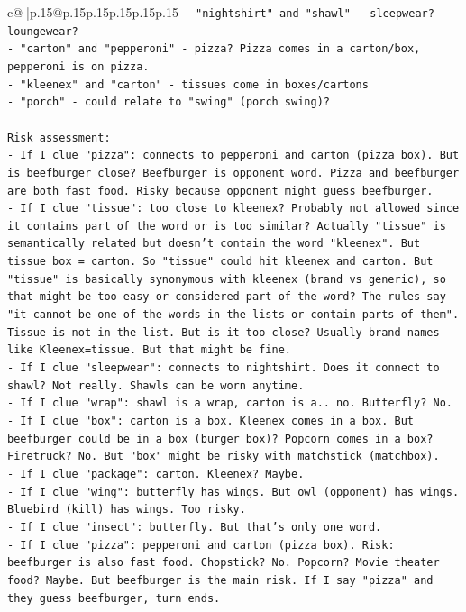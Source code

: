 \documentclass{article}
\begin{document}
{\begin{supertabular}{c@{$\;$}|p{.15\linewidth}@{}p{.15\linewidth}p{.15\linewidth}p{.15\linewidth}p{.15\linewidth}p{.15\linewidth}}
{{{\texttt{{-} "nightshirt" and "shawl" {-} sleepwear? loungewear?} \\
\texttt{{-} "carton" and "pepperoni" {-} pizza? Pizza comes in a carton/box, pepperoni is on pizza.} \\
\texttt{{-} "kleenex" and "carton" {-} tissues come in boxes/cartons} \\
\texttt{{-} "porch" {-} could relate to "swing" (porch swing)?} \\
\\ 
\texttt{Risk assessment:} \\
\texttt{{-} If I clue "pizza": connects to pepperoni and carton (pizza box). But is beefburger close? Beefburger is opponent word. Pizza and beefburger are both fast food. Risky because opponent might guess beefburger.} \\
\texttt{{-} If I clue "tissue": too close to kleenex? Probably not allowed since it contains part of the word or is too similar? Actually "tissue" is semantically related but doesn't contain the word "kleenex". But tissue box = carton. So "tissue" could hit kleenex and carton. But "tissue" is basically synonymous with kleenex (brand vs generic), so that might be too easy or considered part of the word? The rules say "it cannot be one of the words in the lists or contain parts of them". Tissue is not in the list. But is it too close? Usually brand names like Kleenex=tissue. But that might be fine.} \\
\texttt{{-} If I clue "sleepwear": connects to nightshirt. Does it connect to shawl? Not really. Shawls can be worn anytime.} \\
\texttt{{-} If I clue "wrap": shawl is a wrap, carton is a.. no. Butterfly? No.} \\
\texttt{{-} If I clue "box": carton is a box. Kleenex comes in a box. But beefburger could be in a box (burger box)? Popcorn comes in a box? Firetruck? No. But "box" might be risky with matchstick (matchbox).} \\
\texttt{{-} If I clue "package": carton. Kleenex? Maybe.} \\
\texttt{{-} If I clue "wing": butterfly has wings. But owl (opponent) has wings. Bluebird (kill) has wings. Too risky.} \\
\texttt{{-} If I clue "insect": butterfly. But that's only one word.} \\
\texttt{{-} If I clue "pizza": pepperoni and carton (pizza box). Risk: beefburger is also fast food. Chopstick? No. Popcorn? Movie theater food? Maybe. But beefburger is the main risk. If I say "pizza" and they guess beefburger, turn ends.} \\
}}}
\end{supertabular}}
\end{document}
